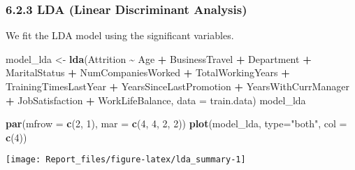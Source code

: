 \documentclass[
]{article}
\newenvironment{Shaded}{\begin{snugshade}}{\end{snugshade}}
\newcommand{\AttributeTok}[1]{\textcolor[rgb]{0.13,0.29,0.53}{#1}}
\newcommand{\DecValTok}[1]{\textcolor[rgb]{0.00,0.00,0.81}{#1}}
\newcommand{\FunctionTok}[1]{\textcolor[rgb]{0.13,0.29,0.53}{\textbf{#1}}}
\newcommand{\NormalTok}[1]{#1}
\newcommand{\OtherTok}[1]{\textcolor[rgb]{0.56,0.35,0.01}{#1}}
\newcommand{\SpecialCharTok}[1]{\textcolor[rgb]{0.81,0.36,0.00}{\textbf{#1}}}
\newcommand{\StringTok}[1]{\textcolor[rgb]{0.31,0.60,0.02}{#1}}
\begin{document}
\newpage

\hypertarget{lda-linear-discriminant-analysis}{%
\subsubsection{6.2.3 LDA (Linear Discriminant
Analysis)}\label{lda-linear-discriminant-analysis}}

We fit the LDA model using the significant variables.

\begin{Shaded}
\begin{Highlighting}[]
\NormalTok{model\_lda }\OtherTok{\textless{}{-}} \FunctionTok{lda}\NormalTok{(Attrition }\SpecialCharTok{\textasciitilde{}} 
\NormalTok{                   Age }\SpecialCharTok{+} 
\NormalTok{                   BusinessTravel }\SpecialCharTok{+} 
\NormalTok{                   Department }\SpecialCharTok{+} 
\NormalTok{                   MaritalStatus }\SpecialCharTok{+} 
\NormalTok{                   NumCompaniesWorked }\SpecialCharTok{+} 
\NormalTok{                   TotalWorkingYears }\SpecialCharTok{+}
\NormalTok{                   TrainingTimesLastYear }\SpecialCharTok{+} 
\NormalTok{                   YearsSinceLastPromotion }\SpecialCharTok{+}
\NormalTok{                   YearsWithCurrManager }\SpecialCharTok{+}
\NormalTok{                   JobSatisfaction }\SpecialCharTok{+}
\NormalTok{                   WorkLifeBalance, }
                 \AttributeTok{data =}\NormalTok{ train.data)}
\NormalTok{model\_lda}
\end{Highlighting}
\end{Shaded}

\begin{Shaded}
\begin{Highlighting}[]
\FunctionTok{par}\NormalTok{(}\AttributeTok{mfrow =} \FunctionTok{c}\NormalTok{(}\DecValTok{2}\NormalTok{, }\DecValTok{1}\NormalTok{), }\AttributeTok{mar =} \FunctionTok{c}\NormalTok{(}\DecValTok{4}\NormalTok{, }\DecValTok{4}\NormalTok{, }\DecValTok{2}\NormalTok{, }\DecValTok{2}\NormalTok{))}
\FunctionTok{plot}\NormalTok{(model\_lda, }\AttributeTok{type=}\StringTok{"both"}\NormalTok{, }\AttributeTok{col =} \FunctionTok{c}\NormalTok{(}\DecValTok{4}\NormalTok{))}
\end{Highlighting}
\end{Shaded}

\begin{center}\texttt{[image: Report\_files/figure-latex/lda\_summary-1]} \end{center}
\end{document}
